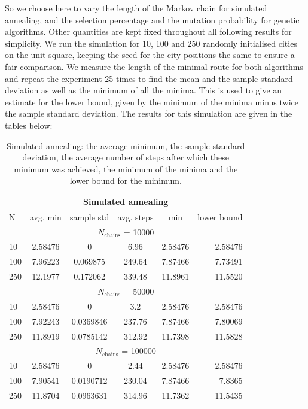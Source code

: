 \documentclass[10pt,a4paper]{article}
\begin{document}
So we choose here to vary the length of the Markov chain for simulated annealing, and the selection percentage and the mutation probability for genetic algorithms. Other quantities are kept fixed throughout all following results for simplicity. We run the simulation for 10, 100 and 250 randomly initialised cities on the unit square, keeping the seed for the city positions the same to ensure a fair comparison. We measure the length of the minimal route for both algorithms and repeat the experiment 25 times to find the mean and the sample standard deviation as well as the minimum of all the minima. This is used to give an estimate for the lower bound, given by the minimum of the minima minus twice the sample standard deviation. The results for this simulation are given in the tables below:

\begin{table}[H]\footnotesize
  \centering
  \begin{tabular}{l | *{4}{c} r}
    \hline
    \multicolumn{6}{c}{Simulated annealing} \\
    \hline
    N & avg. min & sample std & avg. steps & min & lower bound \\
    \hline
    \multicolumn{6}{c}{$N_{\text{chains}}$ = 10000} \\
    \hline
    10 & 2.58476 & 0 & 6.96 & 2.58476 & 2.58476\\
    100 & 7.96223 & 0.069875 & 249.64 & 7.87466 & 7.73491\\
    250 & 12.1977 & 0.172062 & 339.48 & 11.8961 & 11.5520\\
    \hline
    \multicolumn{6}{c}{$N_{\text{chains}}$ = 50000} \\
    \hline
    10 & 2.58476 & 0 & 3.2 & 2.58476 & 2.58476\\
    100 & 7.92243 & 0.0369846 & 237.76 & 7.87466 & 7.80069\\
    250 & 11.8919 & 0.0785142 & 312.92 & 11.7398 & 11.5828\\
    \hline
    \multicolumn{6}{c}{$N_{\text{chains}}$ = 100000} \\
    \hline
    10 & 2.58476 & 0 & 2.44 & 2.58476 & 2.58476\\
    100 & 7.90541 & 0.0190712 & 230.04 & 7.87466 & 7.8365\\
    250 & 11.8704 & 0.0963631 & 314.96 & 11.7362 & 11.5435\\
    \hline    
  \end{tabular}
  \caption{Simulated annealing: the average minimum, the sample standard deviation, the average number of steps after which these minimum was achieved, the minimum of the minima and the lower bound for the minimum.}
  \label{tab:sim_random}
\end{table}
\end{document}
